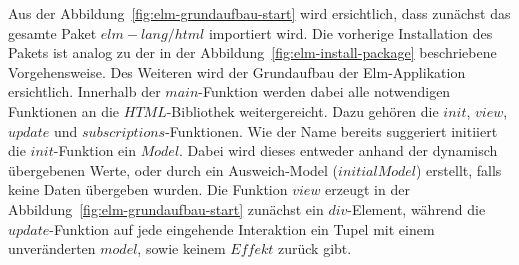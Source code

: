 Aus der Abbildung~\ref{fig:elm-grundaufbau-start} wird ersichtlich, dass zunächst das gesamte Paket $elm-lang/html$ importiert wird. Die vorherige Installation des Pakets ist analog zu der in der Abbildung~\ref{fig:elm-install-package} beschriebene Vorgehensweise. Des Weiteren wird der Grundaufbau der Elm-Applikation ersichtlich.
Innerhalb der $main$-Funktion werden dabei alle notwendigen Funktionen an die $HTML$-Bibliothek weitergereicht. Dazu gehören die $init$, $view$, $update$ und $subscriptions$-Funktionen. Wie der Name bereits suggeriert initiiert die $init$-Funktion ein $Model$. Dabei wird dieses entweder anhand der dynamisch übergebenen Werte, oder durch ein Ausweich-Model ($initialModel$) erstellt, falls keine Daten übergeben wurden.
Die Funktion $view$ erzeugt in der Abbildung~\ref{fig:elm-grundaufbau-start} zunächst ein $div$-Element, während die $update$-Funktion auf jede eingehende Interaktion ein Tupel mit einem unveränderten $model$, sowie keinem $Effekt$ zurück gibt.


